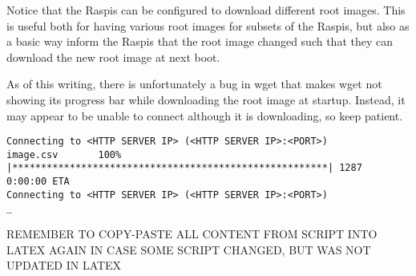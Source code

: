 Notice that the \ac{Raspi}s can be configured to download different root images.
This is useful both for having various root images for subsets of the \ac{Raspi}s,
but also as a basic way inform the \ac{Raspi}s that the root image changed such
that they can download the new root image at next boot.

As of this writing, there is unfortunately a bug in wget that makes wget not showing
its progress bar while downloading the root image at startup. Instead, it may appear
to be unable to connect although it is downloading, so keep patient.

\begin{lstlisting}[]
Connecting to <HTTP SERVER IP> (<HTTP SERVER IP>:<PORT>)
image.csv       100% |*******************************************************| 1287   0:00:00 ETA
Connecting to <HTTP SERVER IP> (<HTTP SERVER IP>:<PORT>)
_
\end{lstlisting}
\FloatBarrier
\vspace{-5mm}


REMEMBER TO COPY-PASTE ALL CONTENT FROM SCRIPT INTO LATEX AGAIN IN CASE SOME
SCRIPT CHANGED, BUT WAS NOT UPDATED IN LATEX
